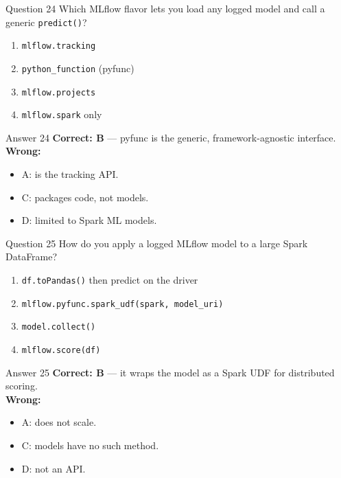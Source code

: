\documentclass[aspectratio=169,11pt]{beamer}
\begin{document}
	\begin{frame}{Question 24}
		Which MLflow flavor lets you load any logged model and call a generic \texttt{predict()}?
		\begin{enumerate}[label=\Alph*.]
			\item \texttt{mlflow.tracking}
			\item \texttt{python\_function} (pyfunc)
			\item \texttt{mlflow.projects}
			\item \texttt{mlflow.spark} only
		\end{enumerate}
	\end{frame}
	\begin{frame}{Answer 24}
		\textbf{Correct: B} --- pyfunc is the generic, framework-agnostic interface.\\
		\vspace{0.5em}
		\textbf{Wrong:}
		\begin{itemize}
			\item A: is the tracking API.
			\item C: packages code, not models.
			\item D: limited to Spark ML models.
		\end{itemize}
	\end{frame}
	
	\begin{frame}{Question 25}
		How do you apply a logged MLflow model to a large Spark DataFrame?
		\begin{enumerate}[label=\Alph*.]
			\item \texttt{df.toPandas()} then predict on the driver
			\item \texttt{mlflow.pyfunc.spark\_udf(spark, model\_uri)}
			\item \texttt{model.collect()}
			\item \texttt{mlflow.score(df)}
		\end{enumerate}
	\end{frame}
	\begin{frame}{Answer 25}
		\textbf{Correct: B} --- it wraps the model as a Spark UDF for distributed scoring.\\
		\vspace{0.5em}
		\textbf{Wrong:}
		\begin{itemize}
			\item A: does not scale.
			\item C: models have no such method.
			\item D: not an API.
		\end{itemize}
	\end{frame}
	
\end{document}
